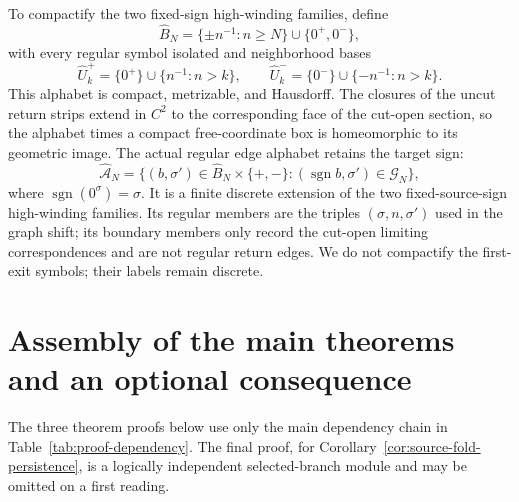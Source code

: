 \documentclass[11pt]{amsart}
\numberwithin{equation}{section}
\theoremstyle{definition}
\theoremstyle{remark}
\begin{document}
To compactify the two fixed-sign high-winding families, define
\begin{equation}\label{eq:split-alphabet}
 \widehat B_N=\{\pm n^{-1}:n\ge N\}\cup\{0^+,0^-\},
\end{equation}
with every regular symbol isolated and neighborhood bases
\begin{equation}\label{eq:split-neighborhoods}
 \widehat U_k^+=\{0^+\}\cup\{n^{-1}:n>k\},\qquad
 \widehat U_k^-=\{0^-\}\cup\{-n^{-1}:n>k\}.
\end{equation}
This alphabet is compact, metrizable, and Hausdorff.  The closures of the
uncut return strips extend in $C^2$ to the corresponding face of the cut-open
section, so the alphabet times a compact free-coordinate box is
homeomorphic to its geometric image.  The actual regular edge alphabet
retains the target sign:
\begin{equation}\label{eq:split-edge-alphabet}
 \widehat{\mathcal A}_N=
 \{(b,\sigma')\in\widehat B_N\times\{+,-\}:
   (\operatorname{sgn}b,\sigma')\in\mathcal G_N\},
\end{equation}
where $\operatorname{sgn}(0^\sigma)=\sigma$.  It is a finite discrete
extension of the two fixed-source-sign high-winding families.  Its regular members are the
triples $(\sigma,n,\sigma')$ used in the graph shift; its boundary members
only record the cut-open limiting correspondences and are not regular
return edges.  We do not compactify the first-exit symbols; their labels
remain discrete.

\section{Assembly of the main theorems and an optional consequence}
\label{sec:main-proof}

The three theorem proofs below use only the main dependency chain in
Table~\ref{tab:proof-dependency}.  The final proof, for
Corollary~\ref{cor:source-fold-persistence}, is a logically independent
selected-branch module and may be omitted on a first reading.
\end{document}
